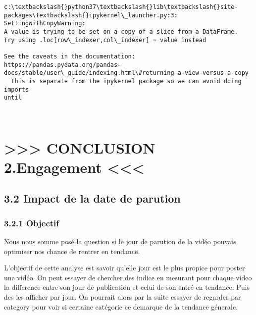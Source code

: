 \documentclass[11pt]{article}
\begin{document}
    \begin{Verbatim}[commandchars=\\\{\}]
c:\textbackslash{}python37\textbackslash{}lib\textbackslash{}site-packages\textbackslash{}ipykernel\_launcher.py:3: SettingWithCopyWarning:
A value is trying to be set on a copy of a slice from a DataFrame.
Try using .loc[row\_indexer,col\_indexer] = value instead

See the caveats in the documentation: https://pandas.pydata.org/pandas-
docs/stable/user\_guide/indexing.html\#returning-a-view-versus-a-copy
  This is separate from the ipykernel package so we can avoid doing imports
until
    \end{Verbatim}

    \begin{center}
    \end{center}
    { \hspace*{\fill} \\}
    
    \hypertarget{conclusion-2.engagement}{%
\section{\textgreater\textgreater\textgreater{} CONCLUSION 2.Engagement
\textless\textless\textless{}}\label{conclusion-2.engagement}}

    \hypertarget{impact-de-la-date-de-parution}{%
\subsection{3.2 Impact de la date de
parution}\label{impact-de-la-date-de-parution}}

\hypertarget{objectif}{%
\subsubsection{3.2.1 Objectif}\label{objectif}}

Nous nous somme posé la question si le jour de parution de la vidéo
pouvais optimiser nos chance de rentrer en tendance.

L'objectif de cette analyse est savoir qu'elle jour est le plus propice
pour poster une vidéo. On peut essayer de chercher des indice en
mesurant pour chaque video la difference entre son jour de publication
et celui de son entré en tendance. Puis des les afficher par jour. On
pourrait alors par la suite essayer de regarder par category pour voir
si certaine catégorie ce demarque de la tendance génerale.
\end{document}
